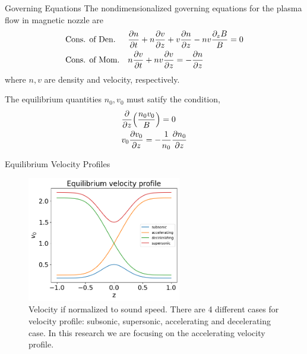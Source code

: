 \begin{frame}{Governing Equations}
  The nondimensionalized governing equations for the plasma flow in magnetic nozzle are \cite{smolyakov_quasineutral_2021}
  \begin{align}
     & \text{Cons. of Den.} &  & \pdv{n}{t} + n\pdv{v}{z} + v\pdv{n}{z} - nv\frac{\partial_z B}{B} = 0 \\
     & \text{Cons. of Mom.} &  & n\pdv{v}{t} + nv\pdv{v}{z} = -\pdv{n}{z}
  \end{align}
  where $n,v$ are density and velocity, respectively.

  The equilibrium quantities $n_0, v_0$ must satify the condition,
  \begin{align}
     & \pdv{z}(\frac{n_0v_0}{B}) = 0 \label{eq:equilibrium-convervation-of-mass}                    \\
     & v_0\pdv{v_0}{z} = -\frac{1}{n_0}\pdv{n_0}{z} \label{eq:equilibrium-convervation-of-momentum}
  \end{align}
\end{frame}

\begin{frame}{Equilibrium Velocity Profiles}
  \begin{figure}
    \begin{center}
      \includegraphics[width=0.6\textwidth]{figures/velocity-profiles.png}
    \end{center}
    \caption{Velocity if normalized to sound speed. There are 4 different cases for velocity profile: subsonic, supersonic, accelerating and decelerating case. In this research we are focusing on the accelerating velocity profile.}
    \label{fig:velocity-profiles}
  \end{figure}
\end{frame}

